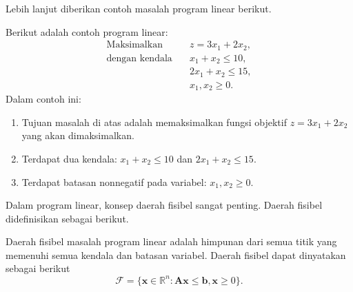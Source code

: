 Lebih lanjut diberikan contoh masalah program linear berikut.
\begin{contoh}
    Berikut adalah contoh program linear:
    $$
    \begin{aligned}
    \text{Maksimalkan} \quad & z = 3x_1 + 2x_2, \\
    \text{dengan kendala} \quad & x_1 + x_2 \leq 10, \\
    & 2x_1 + x_2 \leq 15, \\
    & x_1, x_2 \geq 0.
    \end{aligned}
    $$
    Dalam contoh ini:
    \begin{enumerate}
        \item Tujuan  masalah di atas adalah memaksimalkan fungsi objektif $z = 3x_1 + 2x_2$ yang akan dimaksimalkan.
        \item Terdapat dua kendala: $x_1 + x_2 \leq 10$ dan $2x_1 + x_2 \leq 15$.
        \item Terdapat batasan nonnegatif pada variabel: $x_1, x_2 \geq 0$.
    \end{enumerate}
\end{contoh}

Dalam program linear, konsep daerah fisibel sangat penting. Daerah fisibel didefinisikan sebagai berikut.
\begin{definisi}
Daerah fisibel masalah program linear adalah himpunan dari semua titik yang memenuhi semua kendala dan batasan variabel. Daerah fisibel dapat dinyatakan sebagai berikut
$$\mathcal{F} = \{\boldsymbol{x} \in \mathbb{R}^n : \boldsymbol{Ax} \leq \boldsymbol{b}, \boldsymbol{x} \geq 0\}.$$
\end{definisi}


